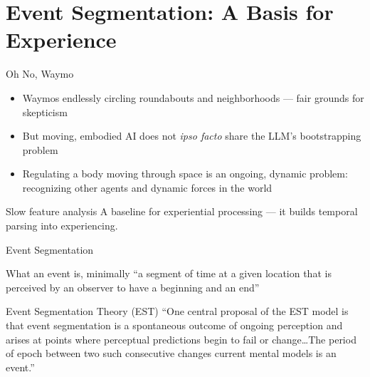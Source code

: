 \documentclass[aspectratio=169]{beamer}
\begin{document}
\section{Event Segmentation: A Basis for Experience}

\begin{frame}{Oh No, Waymo}
  \begin{itemize}
    \item Waymos endlessly circling roundabouts and neighborhoods --- fair grounds for skepticism
    \item<2-> But moving, embodied AI does not \emph{ipso facto} share the LLM's bootstrapping problem
    \item<3-> Regulating a body moving through space is an ongoing, dynamic problem: recognizing other agents and dynamic forces in the world
  \end{itemize}

  \pause
  \vspace{1em}
  \begin{block}{Slow feature analysis \parencite{song2022slow}}
    A baseline for experiential processing --- it builds temporal parsing into experiencing.
  \end{block}
\end{frame}

\begin{frame}{Event Segmentation}
  \begin{block}{What an event is, minimally}
    ``a segment of time at a given location that is perceived by an observer to have a beginning and an end'' \parencite[p.~3]{zackstversky2001event}
  \end{block}

  \pause
  \vspace{1em}
  \begin{block}{Event Segmentation Theory (EST)}
    ``One central proposal of the EST model is that event segmentation is a spontaneous outcome of ongoing perception and arises at points where perceptual predictions begin to fail or change\ldots The period of epoch between two such consecutive changes current mental models is an event.'' \parencite[p.~591]{shipleyzacks2008understanding}
  \end{block}
\end{frame}
\end{document}

